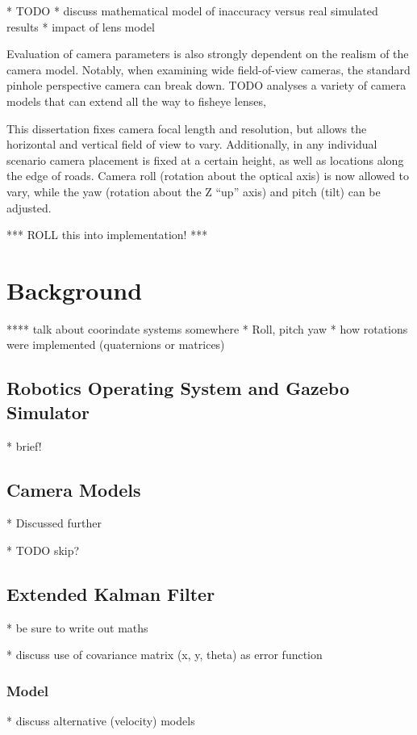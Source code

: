 \documentclass[a4paper,12pt,twoside,openright]{report}
\begin{document}
* TODO
  * discuss mathematical model of inaccuracy versus real simulated results
  * impact of lens model

Evaluation of camera parameters is also strongly dependent on the realism of
the camera model. Notably, when examining wide field-of-view cameras, the standard
pinhole perspective camera can break down. TODO analyses a variety
of camera models that can extend all the way to fisheye lenses, 

This dissertation fixes camera focal length and resolution, but allows the horizontal
and vertical field of view to vary. Additionally, in any individual scenario
camera placement is fixed at a certain height, as well as locations along
the edge of roads. Camera roll (rotation about the optical axis) is now allowed to vary,
while the yaw (rotation about the Z ``up'' axis) and pitch (tilt) can be adjusted.




*** ROLL this into implementation! ***
\chapter{Background} 
\label{chap:background}

**** talk about coorindate systems somewhere
* Roll, pitch yaw
* how rotations were implemented (quaternions or matrices)


\section{Robotics Operating System and Gazebo Simulator}
* brief!

\section{Camera Models}
* Discussed further 

* TODO skip?

\section{Extended Kalman Filter}
* be sure to write out maths

* discuss use of covariance matrix (x, y, theta) as error function


\subsection{Model}

* discuss alternative (velocity) models
\end{document}
